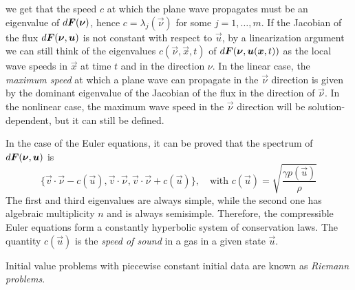 we get that the speed $c$ at which the plane wave propagates must be
an eigenvalue of $d\bm{F}(\bm{\nu})$, hence $c = \lambda_j(\vec{\nu})$
for some $j = 1, \dots, m$. If the Jacobian of the flux
$d\bm{F}(\bm{\nu},\bm{u})$ is not constant with respect to $\vec{u}$,
by a linearization argument we can still think of the eigenvalues
$c(\vec{\nu},\vec{x},t)$ of $d\bm{F}(\bm{\nu},\bm{u}(\bm{x},t))$
as the local wave speeds in $\vec{x}$ at time $t$ and in the direction $\nu$.
In the linear case, the \emph{maximum speed} at which a plane wave
can propagate in the $\vec{\nu}$ direction is given by the
dominant eigenvalue of the Jacobian of the flux in the direction of $\vec{\nu}$.
In the nonlinear case, the maximum wave speed in the $\vec{\nu}$ direction
will be solution-dependent, but it can still be defined.

In the case of the Euler equations, it can be proved
\cite[p.~104]{toro2013riemann} that the spectrum of $d\bm{F}(\bm{\nu},\bm{u})$ is
\[
\{ \vec{v}\cdot\vec{\nu} - c(\vec{u}),
\vec{v}\cdot\vec{\nu},
\vec{v}\cdot\vec{\nu} + c(\vec{u}) \},
\quad \text{with } c(\vec{u}) = \sqrt{\frac{\gamma p(\vec{u})}{\rho}}
\]
The first and third eigenvalues are always simple, while the second
one has algebraic multiplicity $n$ and is always semisimple.
Therefore, the compressible Euler equations form a constantly hyperbolic
system of conservation laws. The quantity $c(\vec{u})$
is the \emph{speed of sound} in a gas in a given state $\vec{u}$.

Initial value problems with piecewise constant initial data are known
as \emph{Riemann problems}.


%

